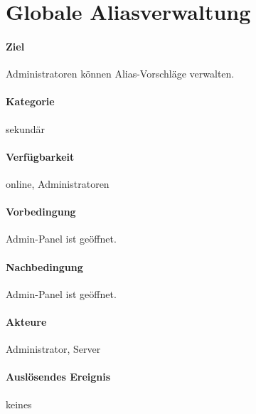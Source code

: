 \section{Globale Aliasverwaltung}
\label{Aliasverwaltungsfunktion}
\paragraph{Ziel}
Administratoren können Alias-Vorschläge verwalten.
\paragraph{Kategorie}
sekundär
\paragraph{Verfügbarkeit}
online, Administratoren
\paragraph{Vorbedingung}
Admin-Panel ist geöffnet.
\paragraph{Nachbedingung}
Admin-Panel ist geöffnet.
\paragraph{Akteure}
Administrator, Server
\paragraph{Auslösendes Ereignis}
keines
